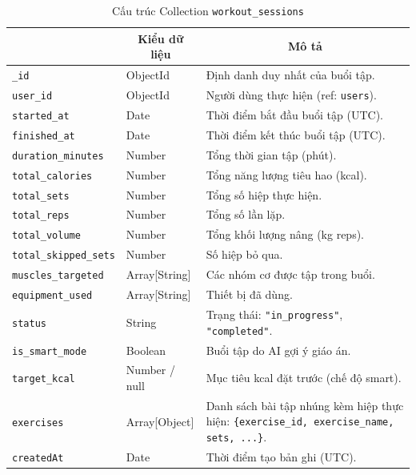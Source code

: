\begin{table}[H]
\centering
\footnotesize
\setlength{\tabcolsep}{5pt}
\renewcommand{\arraystretch}{1.15}
\begin{tabularx}{\textwidth}{|p{3.8cm}|p{2.6cm}|X|}
\hline
\rowcolor{dbheadblue}
\multicolumn{1}{|c|}{\color{white}\textbf{Trường}} &
\multicolumn{1}{c|}{\color{white}\textbf{Kiểu dữ liệu}} &
\multicolumn{1}{c|}{\color{white}\textbf{Mô tả}} \\
\hline
\texttt{\_id}               & ObjectId      & Định danh duy nhất của buổi tập. \\ \hline
\rowcolor{dbrowalt}
\texttt{user\_id}           & ObjectId      & Người dùng thực hiện (ref: \texttt{users}). \\ \hline
\texttt{started\_at}        & Date          & Thời điểm bắt đầu buổi tập (UTC). \\ \hline
\rowcolor{dbrowalt}
\texttt{finished\_at}       & Date          & Thời điểm kết thúc buổi tập (UTC). \\ \hline
\texttt{duration\_minutes}  & Number        & Tổng thời gian tập (phút). \\ \hline
\rowcolor{dbrowalt}
\texttt{total\_calories}    & Number        & Tổng năng lượng tiêu hao (kcal). \\ \hline
\texttt{total\_sets}        & Number        & Tổng số hiệp thực hiện. \\ \hline
\rowcolor{dbrowalt}
\texttt{total\_reps}        & Number        & Tổng số lần lặp. \\ \hline
\texttt{total\_volume}      & Number        & Tổng khối lượng nâng (kg \texttimes{} reps). \\ \hline
\rowcolor{dbrowalt}
\texttt{total\_skipped\_sets} & Number       & Số hiệp bỏ qua. \\ \hline
\texttt{muscles\_targeted}  & Array[String] & Các nhóm cơ được tập trong buổi. \\ \hline
\rowcolor{dbrowalt}
\texttt{equipment\_used}    & Array[String] & Thiết bị đã dùng. \\ \hline
\texttt{status}            & String        & Trạng thái: \texttt{"in\_progress"}, \texttt{"completed"}. \\ \hline
\rowcolor{dbrowalt}
\texttt{is\_smart\_mode}     & Boolean       & Buổi tập do AI gợi ý giáo án. \\ \hline
\texttt{target\_kcal}       & Number / null & Mục tiêu kcal đặt trước (chế độ smart). \\ \hline
\rowcolor{dbrowalt}
\texttt{exercises}         & Array[Object] & Danh sách bài tập nhúng kèm hiệp thực hiện: \texttt{\{exercise\_id, exercise\_name, sets, ...\}}. \\ \hline
\texttt{createdAt}         & Date          & Thời điểm tạo bản ghi (UTC). \\ \hline
\end{tabularx}
\caption{Cấu trúc Collection \texttt{workout\_sessions}}
\label{tab:col_workout_sessions}
\end{table}

